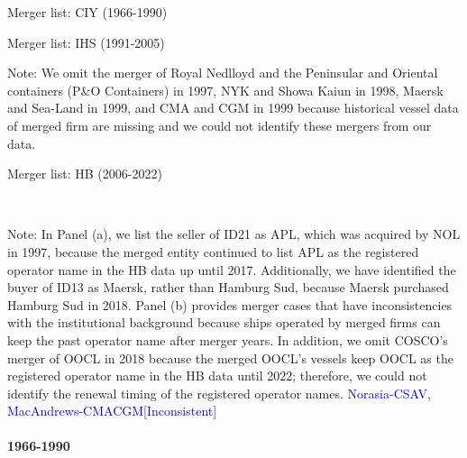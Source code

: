 \documentclass[10pt]{article}
\begin{document}
\begin{table}[!htbp]
  \begin{center}
      \caption{Merger list: CIY (1966-1990)}
      \label{tb:merger_list_CIY} 
      
  \end{center}\footnotesize
\end{table} 

\begin{table}[!htbp]
  \begin{center}
      \caption{Merger list: IHS (1991-2005)}
      \label{tb:merger_list_IHS} 
      
  \end{center}\footnotesize
  Note: We omit the merger of Royal Nedlloyd and the Peninsular and Oriental containers (P\&O Containers) in 1997, NYK and Showa Kaiun in 1998, Maersk and Sea-Land in 1999, and CMA and CGM in 1999 because historical vessel data of merged firm are missing and we could not identify these mergers from our data.
\end{table} 

\begin{table}[!htbp]
  \begin{center}
      \caption{Merger list: HB (2006-2022)}
      \label{tb:merger_list_HB} 
      \subfloat[HB (2006-2022)]{}\\
  \end{center}\footnotesize
  Note: In Panel (a), we list the seller of ID21 as APL, which was acquired by NOL in 1997, because the merged entity continued to list APL as the registered operator name in the HB data up until 2017. Additionally, we have identified the buyer of ID13 as Maersk, rather than Hamburg Sud, because Maersk purchased Hamburg Sud in 2018.
  Panel (b) provides merger cases that have inconsistencies with the institutional background because ships operated by merged firms can keep the past operator name after merger years.  In addition, we omit COSCO's merger of OOCL in 2018 because the merged OOCL's vessels keep OOCL as the registered operator name in the HB data until 2022; therefore, we could not identify the renewal timing of the registered operator names. \textcolor{blue}{Norasia-CSAV, MacAndrews-CMACGM[Inconsistent]}
\end{table} 

\paragraph{1966-1990} 
\end{document}
